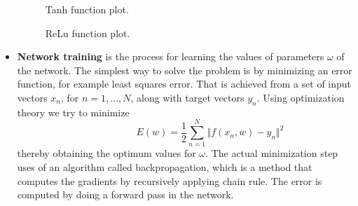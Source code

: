 \begin{itemize}
\begin{figure}[tb] 
\centering 
{}
\caption{Tanh function plot.}
\label{fig:tanhfun1} 
\end{figure}

\begin{figure}[tb] 
\centering 
{}
\caption{ReLu function plot.}
\label{fig:ReLu1} 
\end{figure}


\item \textbf{Network training} is the process for learning the values of parameters $\omega$ of the network. The simplest way to solve the problem is by minimizing an error function, for example least squares error. That is achieved from a set of input vectors $x_n$, for $n = 1,...,N$, along with target vectors $y_n$. Using optimization theory we try to minimize 
\begin{equation} \label{eq:LS1}
\hspace{3em} \hspace{3em} \hspace{3em} E (w) = \frac{1}{2} \sum\limits_{n=1}^N \Vert f(x_n,w) - y_n\Vert^2 \enspace \enspace \hspace{3em}
\end{equation} 
thereby obtaining the optimum values for $\omega$. The actual minimization step uses of an algorithm called backpropagation, which is a method that computes the gradients by recursively applying chain rule. The error is computed by doing a forward pass in the network.  


\end{itemize}
